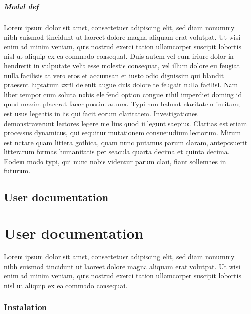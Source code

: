 \paragraph{Modul def}
Lorem ipsum dolor sit amet, consectetuer adipiscing elit, sed diam nonummy nibh euismod tincidunt ut laoreet dolore magna aliquam erat volutpat. Ut wisi enim ad minim veniam, quis nostrud exerci tation ullamcorper suscipit lobortis nisl ut aliquip ex ea commodo consequat. Duis autem vel eum iriure dolor in hendrerit in vulputate velit esse molestie consequat, vel illum dolore eu feugiat nulla facilisis at vero eros et accumsan et iusto odio dignissim qui blandit praesent luptatum zzril delenit augue duis dolore te feugait nulla facilisi. Nam liber tempor cum soluta nobis eleifend option congue nihil imperdiet doming id quod mazim placerat facer possim assum. Typi non habent claritatem insitam; est usus legentis in iis qui facit eorum claritatem. Investigationes demonstraverunt lectores legere me lius quod ii legunt saepius. Claritas est etiam processus dynamicus, qui sequitur mutationem consuetudium lectorum. Mirum est notare quam littera gothica, quam nunc putamus parum claram, anteposuerit litterarum formas humanitatis per seacula quarta decima et quinta decima. Eodem modo typi, qui nunc nobis videntur parum clari, fiant sollemnes in futurum.
\newpage
{}
{
	\section{User documentation}
}
{
	\chapter{User documentation}
}
Lorem ipsum dolor sit amet, consectetuer adipiscing elit, sed diam nonummy nibh euismod tincidunt ut laoreet dolore magna aliquam erat volutpat. Ut wisi enim ad minim veniam, quis nostrud exerci tation ullamcorper suscipit lobortis nisl ut aliquip ex ea commodo consequat. 
{
	\subsection{Instalation}
}
